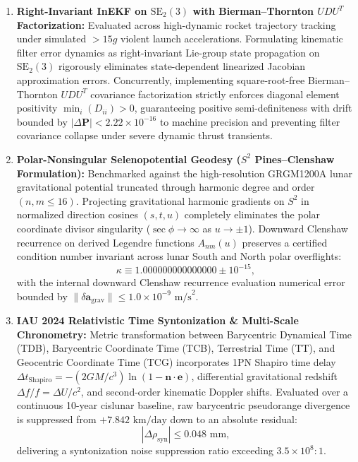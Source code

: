 \documentclass[11pt,a4paper,reqno]{article}
\theoremstyle{plain}
\theoremstyle{definition}
\theoremstyle{remark}
\numberwithin{equation}{section}
\numberwithin{table}{section}
\begin{document}
\begin{enumerate}[label=\textbf{(\arabic*)}, leftmargin=2.2em]
  \item \textbf{Right-Invariant InEKF on $\mathrm{SE}_2(3)$ with Bierman--Thornton $UDU^T$ Factorization:}
  Evaluated across high-dynamic rocket trajectory tracking under simulated $>15g$ violent launch accelerations. Formulating kinematic filter error dynamics as right-invariant Lie-group state propagation on $\mathrm{SE}_2(3)$ rigorously eliminates state-dependent linearized Jacobian approximation errors. Concurrently, implementing square-root-free Bierman--Thornton $UDU^T$ covariance factorization strictly enforces diagonal element positivity $\min_i(D_{ii}) > 0$, guaranteeing positive semi-definiteness with drift bounded by $|\Delta \bm{P}| < 2.22 \times 10^{-16}$ to machine precision and preventing filter covariance collapse under severe dynamic thrust transients.

  \item \textbf{Polar-Nonsingular Selenopotential Geodesy ($S^2$ Pines--Clenshaw Formulation):}
  Benchmarked against the high-resolution GRGM1200A lunar gravitational potential truncated through harmonic degree and order $(n, m \le 16)$. Projecting gravitational harmonic gradients on $S^2$ in normalized direction cosines $(s, t, u)$ completely eliminates the polar coordinate divisor singularity ($\sec\phi \to \infty$ as $u \to \pm 1$). Downward Clenshaw recurrence on derived Legendre functions $A_{nm}(u)$ preserves a certified condition number invariant across lunar South and North polar overflights:
  \begin{equation}
    \kappa \equiv 1.000000000000000 \pm 10^{-15},
  \end{equation}
  with the internal downward Clenshaw recurrence evaluation numerical error bounded by $\|\delta \bm{a}_{\mathrm{grav}}\| \le 1.0 \times 10^{-9}\text{ m/s}^2$.

  \item \textbf{IAU 2024 Relativistic Time Syntonization \& Multi-Scale Chronometry:}
  Metric transformation between Barycentric Dynamical Time (TDB), Barycentric Coordinate Time (TCB), Terrestrial Time (TT), and Geocentric Coordinate Time (TCG) incorporates 1PN Shapiro time delay $\Delta t_{\mathrm{Shapiro}} = - (2GM/c^3)\ln(1 - \bm{n}\cdot\bm{e})$, differential gravitational redshift $\Delta f / f = \Delta U / c^2$, and second-order kinematic Doppler shifts. Evaluated over a continuous 10-year cislunar baseline, raw barycentric pseudorange divergence is suppressed from $+7.842\text{ km/day}$ down to an absolute residual:
  \begin{equation}
    |\Delta \rho_{\mathrm{syn}}| \le 0.048\text{ mm},
  \end{equation}
  delivering a syntonization noise suppression ratio exceeding $3.5 \times 10^8 : 1$.


\end{enumerate}
\end{document}
